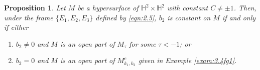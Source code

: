 \documentclass[reqno]{amsart}%
\newtheorem{proposition}[theorem]{Proposition}
\theoremstyle{definition}
\numberwithin{equation}{section}
\begin{document}
\begin{proposition}\label{prop:3.61}
Let $M$ be a hypersurface of $\mathbb{H}^2\times\mathbb{H}^2$ with constant $C\neq\pm1$.
Then, under the frame $\{E_1,E_2,E_3\}$ defined by \eqref{eqn:2.5}, $b_2$ is constant on $M$ if and only if either
%
\begin{enumerate}
\item[(1)]
$b_2\neq 0$ and $M$ is an open part of $M_\tau$ for some $\tau<-1$; or

\item[(2)]
$b_2=0$ and $M$ is an open part of $M_{k_1,k_2}^c$ given in Example \ref{exam:3.4fg1}. %

%
\end{enumerate}
\end{proposition}
\end{document}

